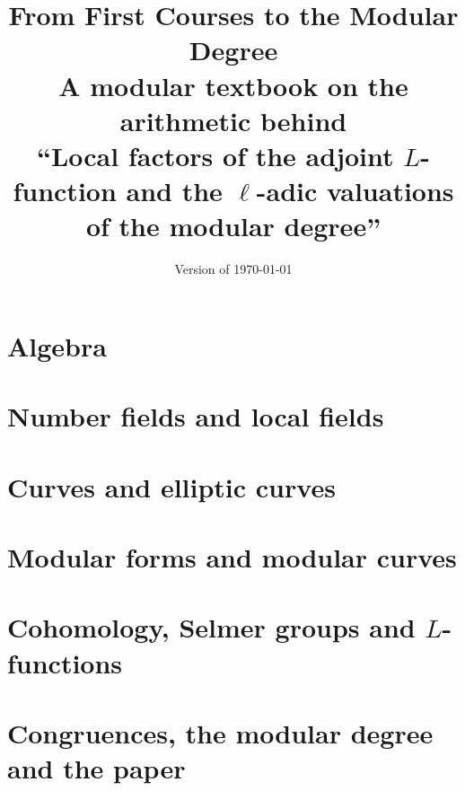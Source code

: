 \documentclass[11pt,twoside,openright]{book}
\title{From First Courses to the Modular Degree\\[1ex]
\large A modular textbook on the arithmetic behind\\
``Local factors of the adjoint $L$-function and the $\ell$-adic valuations of the modular degree''}
\author{}
\date{Version of \today}
\begin{document}
\frontmatter
\maketitle


\makeatletter\renewcommand{\@pnumwidth}{2.4em}\renewcommand{\@tocrmarg}{3.2em}\makeatother
\tableofcontents

\mainmatter

\part{Algebra}





\part{Number fields and local fields}




\part{Curves and elliptic curves}





\part{Modular forms and modular curves}





\part{Cohomology, Selmer groups and $L$-functions}





\part{Congruences, the modular degree and the paper}




\appendix



\backmatter


\end{document}
